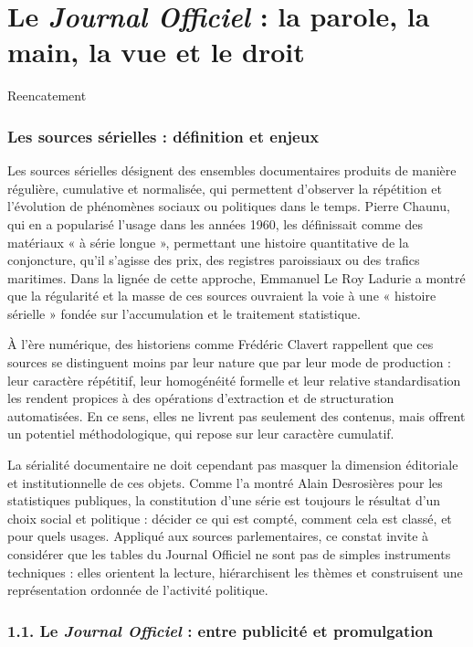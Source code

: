 \chapter{Le \emph{Journal Officiel} : la parole, la main, la vue et le droit}

Reencatement

\subsection{Les sources sérielles : définition et enjeux}

Les sources sérielles désignent des ensembles documentaires produits de manière régulière, cumulative et normalisée, qui permettent d’observer la répétition et l’évolution de phénomènes sociaux ou politiques dans le temps. Pierre Chaunu, qui en a popularisé l’usage dans les années 1960, les définissait comme des matériaux « à série longue », permettant une histoire quantitative de la conjoncture, qu’il s’agisse des prix, des registres paroissiaux ou des trafics maritimes. Dans la lignée de cette approche, Emmanuel Le Roy Ladurie a montré que la régularité et la masse de ces sources ouvraient la voie à une « histoire sérielle » fondée sur l’accumulation et le traitement statistique.

À l’ère numérique, des historiens comme Frédéric Clavert rappellent que ces sources se distinguent moins par leur nature que par leur mode de production : leur caractère répétitif, leur homogénéité formelle et leur relative standardisation les rendent propices à des opérations d’extraction et de structuration automatisées. En ce sens, elles ne livrent pas seulement des contenus, mais offrent un potentiel méthodologique, qui repose sur leur caractère cumulatif.

La sérialité documentaire ne doit cependant pas masquer la dimension éditoriale et institutionnelle de ces objets. Comme l’a montré Alain Desrosières pour les statistiques publiques, la constitution d’une série est toujours le résultat d’un choix social et politique : décider ce qui est compté, comment cela est classé, et pour quels usages. Appliqué aux sources parlementaires, ce constat invite à considérer que les tables du Journal Officiel ne sont pas de simples instruments techniques : elles orientent la lecture, hiérarchisent les thèmes et construisent une représentation ordonnée de l’activité politique.

\subsection{1.1. Le \emph{Journal Officiel} : entre publicité et promulgation}

